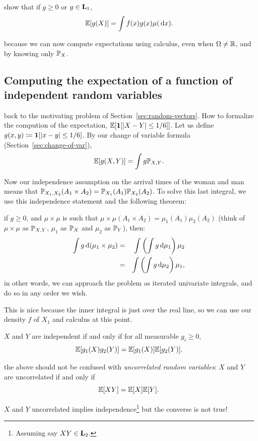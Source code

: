 \documentclass{article}
\begin{document}
 show that if $g \ge 0$ or $g \in \L_1$, 
\[ \E[g(X)] = \int f(x) g(x) \mu(\ud x). \]

 because we can now compute expectations using calculus, even when $\Omega \neq \R$, and by knowing only $\P_X$.


\subsection{Computing the expectation of a function of independent random variables}\label{sec:expectation-indep}

 back to the motivating problem of Section~\ref{sec:random-vectors}. How to formalize the compution of the expectation, $\E[\1[|X-Y| \le 1/6]]$. Let us define $g(x,y) \defeq \1[|x-y| \le 1/6]$. By our change of variable formula (Section~\ref{sec:change-of-var}), \[ \E[ g(X,Y) ] = \int g \P_{X,Y}. \]

Now our independence assumption on the arrival times of the woman and man means that $\P_{X_1,X_2}(A_1 \times A_2) = \P_{X_1}(A_1) \P_{X_2}(A_2)$. To solve this last integral, we use this independence statement and the following theorem:

 if $g \ge 0$, and $\mu \times \mu$ is such that $\mu \times \mu(A_1 \times A_2) = \mu_1(A_1) \mu_2(A_2)$ (think of $\mu \times \mu$ as $\P_{X,Y}$, $\mu_1$ as $\P_X$ and $\mu_2$ as $\P_Y$), then:
\begin{eqnarray*}
\int g \ud(\mu_1 \times \mu_2) &=& \int \left( \int g \ud \mu_1 \right) \mu_2 \\
&=& \int \left( \int g \ud \mu_2 \right) \mu_1,
\end{eqnarray*}
in other words, we can approach the problem as iterated univariate integrals, and do so in any order we wish.

\noindent This is nice because the inner integral is just over the real line, so we can use our density $f$ of $X_1$ and calculus at this point.

 $X$ and $Y$ are independent if and only if for all measurable $g_i \ge 0$, \[ \E[g_1(X) g_2(Y) ] = \E[g_1(X)] \E[g_2(Y)]. \]

 the above should not be confused with \emph{uncorrelated random variables}: $X$ and $Y$ are uncorrelated if and only if \[ \E[XY] = \E[X] \E[Y]. \]

 $X$ and $Y$ uncorrelated implies independence\footnote{Assuming say $XY \in \L_2$.} but the converse is not true!
\end{document}

